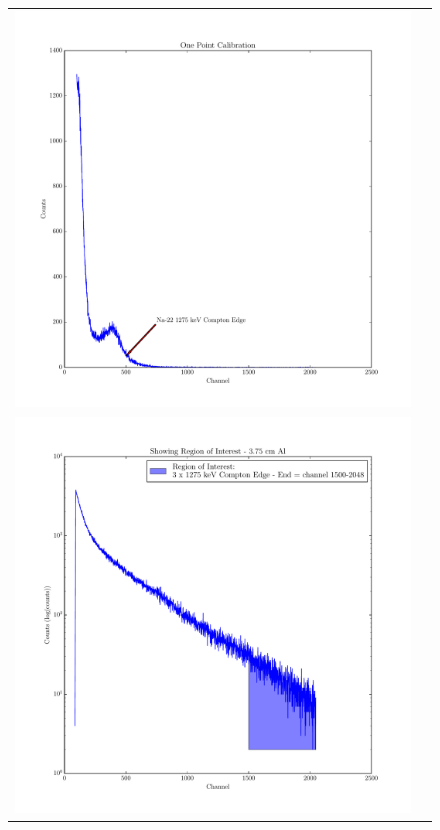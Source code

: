 \documentclass{article}
\begin{document}
  \hspace{.25cm}

  \begin{figure}[!htb]
    \centering
    \begin{tabular}{c c}
      \includegraphics[scale=.4]{../plots/na_calibration_absorber_countrates.pdf} \\ \includegraphics[scale=.4]{../plots/example_cross_section_highlight_roi.pdf}

\end{tabular}
\end{figure}
\end{document}
